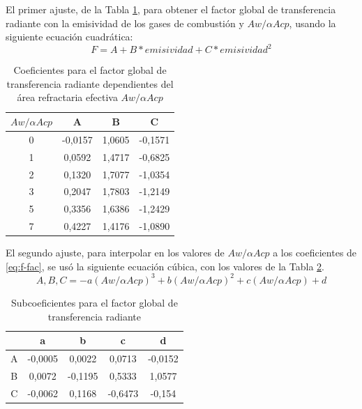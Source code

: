 \par El primer ajuste, de la Tabla \ref{tbl:f-coef}, para obtener el factor global de transferencia radiante con la emisividad de los gases de combustión y $Aw/\alpha Acp$, usando la siguiente ecuación cuadrática:
\begin{equation}
\label{eq:f-fac}
F = A + B*emisividad + C*emisividad^2
\end{equation}
\begin{table}[H]
\caption{Coeficientes para el factor global de transferencia radiante dependientes del área refractaria efectiva $Aw/\alpha Acp$}
\label{tbl:f-coef}
\centering
\begin{tabular}{c|c|c|c}
$Aw/\alpha Acp$	&A	        & B	        &C      \\
\hline
0	    &-0,0157	& 1,0605	&-0,1571\\
1	    & 0,0592	& 1,4717	&-0,6825\\
2	    & 0,1320	& 1,7077	&-1,0354\\
3	    & 0,2047	& 1,7803	&-1,2149\\
5	    & 0,3356	& 1,6386	&-1,2429\\
7	    & 0,4227	& 1,4176	&-1,0890\\
\end{tabular}
\end{table}

\par El segundo ajuste, para interpolar en los valores de $Aw/\alpha Acp$ a los coeficientes de \ref{eq:f-fac}, se usó la siguiente ecuación cúbica, con los valores de la Tabla \ref{tbl:aw-fac}.
\begin{equation}
\label{eq:aw-fac}
A, B, C = -a(Aw/\alpha Acp)^3+b(Aw/\alpha Acp)^2+c(Aw/\alpha Acp)+d
\end{equation}
\begin{table}[H]
\caption{Subcoeficientes para el factor global de transferencia radiante}
\label{tbl:aw-fac}
\centering
\begin{tabular}{c|c|c|c|c}
    &	a	    & b         & c         &d      \\
    \hline
A	& -0,0005	& 0,0022	&0,0713	    &-0,0152\\
B	& 0,0072 	& -0,1195	&0,5333	    &1,0577 \\
C	& -0,0062   & 0,1168	&-0,6473	&-0,154 \\
\end{tabular}
\end{table}


